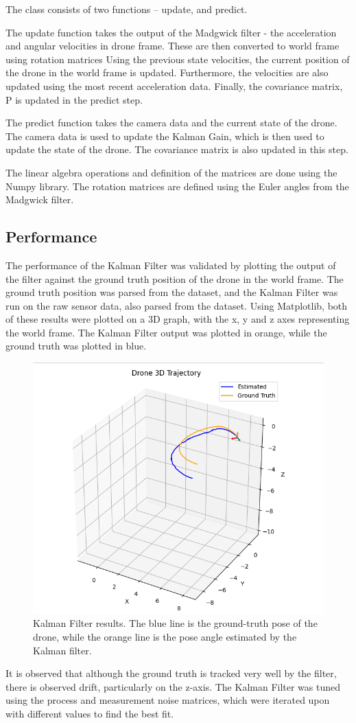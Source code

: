 \documentclass[bare_jrnl_transmag]{subfiles}
\begin{document}
The class consists of two functions -- update, and predict. 

The update function takes the output of the Madgwick filter - the acceleration and angular velocities in drone frame. These are then converted to world frame using rotation matrices Using the previous state velocities, the current position of the drone in the world frame is updated. Furthermore, the velocities are also updated using the most recent acceleration data. Finally, the covariance matrix, P is updated in the predict step.

The predict function takes the camera data and the current state of the drone. The camera data is used to update the Kalman Gain, which is then used to update the state of the drone. The covariance matrix is also updated in this step.

The linear algebra operations and definition of the matrices are done using the Numpy library. The rotation matrices are defined using the Euler angles from the Madgwick filter. 

\subsection{Performance}
The performance of the Kalman Filter was validated by plotting the output of the filter against the ground truth position of the drone in the world frame. The ground truth position was parsed from the dataset, and the Kalman Filter was run on the raw sensor data, also parsed from the dataset. Using Matplotlib, both of these results were plotted on a 3D graph, with the x, y and z axes representing the world frame. The Kalman Filter output was plotted in orange, while the ground truth was plotted in blue. 

\begin{figure}[H]
    \centering
    \includegraphics[width=0.8\linewidth]{figures/ekf_results.png}
    \caption{Kalman Filter results. The blue line is the ground-truth pose of the drone, while the orange line is the pose angle estimated by the Kalman filter.}
    \label{fig:kalman_results}
\end{figure}

It is observed that although the ground truth is tracked very well by the filter, there is observed drift, particularly on the z-axis. The Kalman Filter was tuned using the process and measurement noise matrices, which were iterated upon with different values to find the best fit. 
\end{document}
